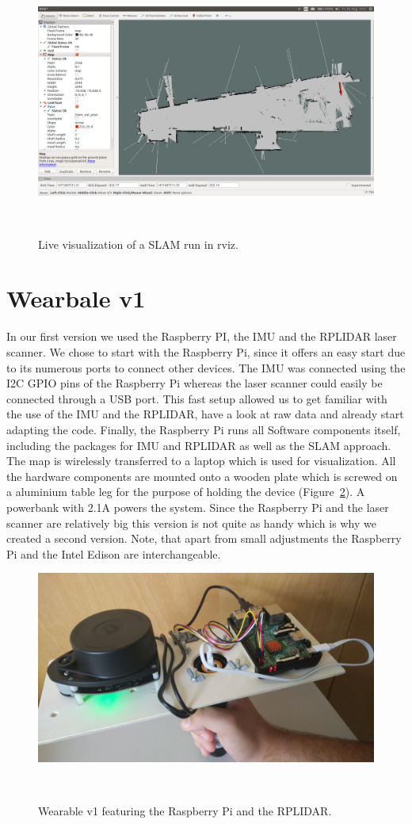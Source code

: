 \documentclass{sigchi-ext}
\begin{document}
\begin{figure}
  \includegraphics[width=\textwidth]{101.png}
  \caption{Live visualization of a SLAM run in rviz.}~\label{fig:software}
\end{figure}

\section{Wearbale v1}
In our first version we used the Raspberry PI, the IMU and the RPLIDAR laser scanner. We chose to start with the Raspberry Pi, since it offers an easy start due to its numerous ports to connect other devices. The IMU was connected using the I2C GPIO pins of the Raspberry Pi whereas the laser scanner could easily be connected through a USB port. This fast setup allowed us to get familiar with the use of the IMU and the RPLIDAR, have a look at raw data and already start adapting the code. Finally, the Raspberry Pi runs all Software components itself, including the packages for IMU and RPLIDAR as well as the SLAM approach. The map is wirelessly transferred to a laptop which is used for visualization. All the hardware components are mounted onto a wooden plate which is screwed on a aluminium table leg for the purpose of holding the device (Figure~\ref{fig:v1}). A powerbank with 2.1A powers the system. Since the Raspberry Pi and the laser scanner are relatively big this version is not quite as handy which is why we created a second version. Note, that apart from small adjustments the Raspberry Pi and the Intel Edison are interchangeable.

\begin{figure}
  \includegraphics[width=0.9\columnwidth]{pi-lidar.jpg}
  \caption{Wearable v1 featuring the Raspberry Pi and the RPLIDAR.}~\label{fig:v1}
\end{figure}
\end{document}
